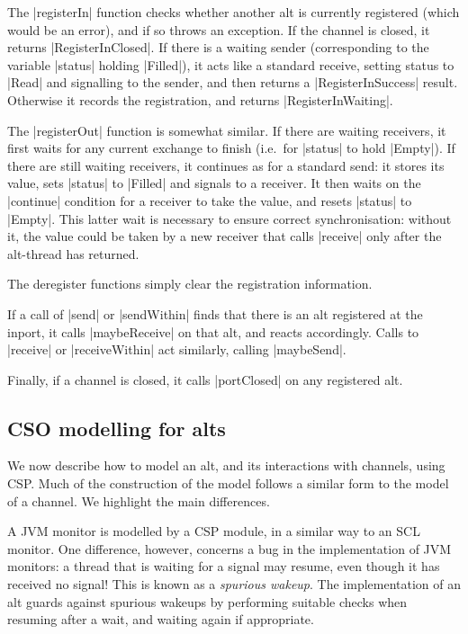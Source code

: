 The |registerIn| function checks whether another alt is currently registered
(which would be an error), and if so throws an exception.  If the channel is
closed, it returns |RegisterInClosed|.  If there is a waiting sender
(corresponding to the variable |status| holding |Filled|), it acts like a
standard receive, setting status to |Read| and signalling to the sender, and
then returns a |RegisterInSuccess| result.  Otherwise it records the
registration, and returns |RegisterInWaiting|.  

The |registerOut| function is somewhat similar.  If there are waiting
receivers, it first waits for any current exchange to finish (i.e.~for
|status| to hold |Empty|).  If there are still waiting receivers, it continues
as for a standard send: it stores its value, sets |status| to |Filled| and
signals to a receiver.  It then waits on the |continue| condition for a
receiver to take the value, and resets |status| to |Empty|.  This latter wait
is necessary to ensure correct synchronisation: without it, the value could be
taken by a new receiver that calls |receive| only after the alt-thread has
returned.  

The deregister functions simply clear the registration information.

If a call of |send| or |sendWithin| finds that there is an alt registered at
the inport, it calls |maybeReceive| on that alt, and reacts accordingly.
Calls to |receive| or |receiveWithin| act similarly, calling |maybeSend|.  

Finally, if a channel is closed, it calls |portClosed| on any registered alt. 


\subsection{CSO modelling for alts}

\inlineCSP

We now describe how to model an alt, and its interactions with channels, using
CSP\@.  Much of the construction of the model follows a similar form to the
model of a channel.  We highlight the main differences. 

A JVM monitor is modelled by a CSP module, in a similar way to an SCL monitor.
One difference, however, concerns a bug in the implementation of JVM monitors:
a thread that is waiting for a signal may resume, even though it has received
no signal!  This is known as a \emph{spurious wakeup}.  The implementation of
an alt guards against spurious wakeups by performing suitable checks when
resuming after a wait, and waiting again if appropriate.  

